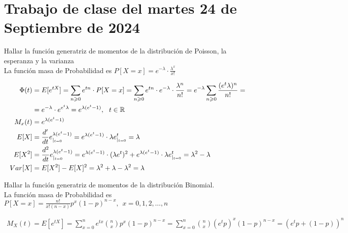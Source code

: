\section{Trabajo de clase del martes 24 de Septiembre de 2024}

\begin{ejercicio}
    Hallar la función generatriz de momentos de la distribución de Poisson, la esperanza y la varianza\\

    La función masa de Probabilidad es $P[X=x] = e^{-\lambda} \cdot \frac{\lambda^x}{x!}$

    \begin{align*}
        \Phi(t) &= E[e^{tX}] = \sum\limits_{n\geq 0} e^{tn}\cdot P[X=x] = \sum\limits_{n\geq 0} e^{tn} \cdot e^{-\lambda} \cdot \frac{\lambda^n}{n!} = e^{-\lambda} \sum\limits_{n\geq 0} \frac{(e^t\lambda)^n}{n!} = \\
        &= e^{-\lambda} \cdot e^{e^t \lambda} = e^{\lambda(e^t-1)},\ \ t \in \bb{R}\\
        M_x(t) &= e^{\lambda(e^t-1)}\\
        E[X] &= \frac{d'}{dt}e^{\lambda(e^t-1)}_{|_{t=0}} = e^{\lambda (e^t-1)}\cdot \lambda e^t _{|_{t=0}} = \lambda\\
        E[X^2] &= \frac{d^2}{dt} e^{\lambda(e^t-1)}_{|_{t=0}} = e^{\lambda (e^t-1)} \cdot (\lambda e^t)^2 + e^{\lambda (e^t-1)}\cdot \lambda e^t _{|_{t=0}} = \lambda^2 - \lambda\\
        Var[X] &= E[X^2] - E[X]^2 = \lambda^2 + \lambda - \lambda ^2 = \lambda
    \end{align*}

    
\end{ejercicio}

\begin{ejercicio}
    Hallar la función generatriz de momentos de la distribución Binomial.\\

    La función masa de Probabilidad es $P[X=x]=\frac{n!}{x!(n-x)}p^x (1-p)^{n-x},\ \ x=0,1,2,\dots,n$

    \begin{align*}
        M_X(t) = E[e^{tX}] = \sum\limits_{x=0}^n e^{tx} \binom{n}{x} p^x (1-p)^{n-x} = 
        \sum\limits_{x=0}^n\binom{n}{x} (e^t p)^x (1-p)^{n-x} = (e^tp+(1-p))^n
    \end{align*}
\end{ejercicio}

